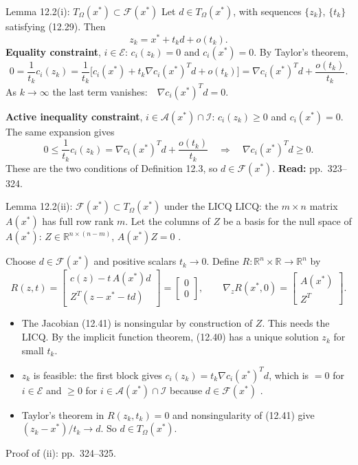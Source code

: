 \documentclass[aspectratio=169,12pt]{beamer}
\newcommand{\R}{\mathbb{R}}
\newcommand{\xs}{x^{*}}
\newcommand{\eqn}[1]{\text{\small(#1)}}
\newcommand{\readbook}[1]{{\color{red}\textbf{Read:} #1}}
\newcommand{\cA}{\mathcal{A}}
\newcommand{\cE}{\mathcal{E}}
\newcommand{\cF}{\mathcal{F}}
\newcommand{\cI}{\mathcal{I}}
\newcommand{\TO}{T_{\Omega}}
\begin{document}
\begin{frame}{Lemma 12.2(i): $\TO(\xs)\subset\cF(\xs)$}
  Let $d\in\TO(\xs)$, with sequences $\{z_{k}\}$, $\{t_{k}\}$ satisfying (12.29). Then
  \[ z_{k}=\xs+t_{k}d+o(t_{k}) . \tag{12.38} \]
  \textbf{Equality constraint}, $i\in\cE$: $c_{i}(z_{k})=0$ and $c_{i}(\xs)=0$. By Taylor's theorem,
  \[ 0=\frac{1}{t_{k}}c_{i}(z_{k})=\frac{1}{t_{k}}\bigl[c_{i}(\xs)+t_{k}\nabla c_{i}(\xs)^{T}d+o(t_{k})\bigr]
      =\nabla c_{i}(\xs)^{T}d+\frac{o(t_{k})}{t_{k}} . \]
  As $k\to\infty$ the last term vanishes:\ \ $\nabla c_{i}(\xs)^{T}d=0$.

  \vspace{0.6em}
  \textbf{Active inequality constraint}, $i\in\cA(\xs)\cap\cI$: $c_{i}(z_{k})\ge 0$ and $c_{i}(\xs)=0$.
  The same expansion gives
  \[ 0\le\frac{1}{t_{k}}c_{i}(z_{k})=\nabla c_{i}(\xs)^{T}d+\frac{o(t_{k})}{t_{k}}
     \quad\Longrightarrow\quad\nabla c_{i}(\xs)^{T}d\ge 0 . \]
  These are the two conditions of Definition 12.3, so $d\in\cF(\xs)$.
  \readbook{pp.~323--324.}
\end{frame}

\begin{frame}{Lemma 12.2(ii): $\cF(\xs)\subset\TO(\xs)$ under the LICQ}
  LICQ: the $m\times n$ matrix $A(\xs)$ has full row rank $m$. Let the columns of $Z$ be a basis for
  the null space of $A(\xs)$: $Z\in\R^{n\times(n-m)}$, $A(\xs)Z=0$ \eqn{12.39}.

  Choose $d\in\cF(\xs)$ and positive scalars $t_{k}\to 0$. Define $R:\R^{n}\times\R\to\R^{n}$ by
  \[ R(z,t)=\begin{bmatrix}c(z)-t\,A(\xs)d\\[0.15em] Z^{T}(z-\xs-td)\end{bmatrix}
      =\begin{bmatrix}0\\0\end{bmatrix},\qquad
     \nabla_{z}R(\xs,0)=\begin{bmatrix}A(\xs)\\ Z^{T}\end{bmatrix} . \tag{12.40, 12.41} \]
  \begin{itemize}\setlength\itemsep{0.3em}
    \item The Jacobian (12.41) is nonsingular by construction of $Z$. \alert{This needs the LICQ.}
      By the implicit function theorem, (12.40) has a unique solution $z_{k}$ for small $t_{k}$.
    \item $z_{k}$ is feasible: the first block gives $c_{i}(z_{k})=t_{k}\nabla c_{i}(\xs)^{T}d$, which is
      $=0$ for $i\in\cE$ and $\ge 0$ for $i\in\cA(\xs)\cap\cI$ because $d\in\cF(\xs)$ \eqn{12.42}.
    \item Taylor's theorem in $R(z_{k},t_{k})=0$ and nonsingularity of (12.41) give
      $(z_{k}-\xs)/t_{k}\to d$. So $d\in\TO(\xs)$.
  \end{itemize}
  Proof of (ii): pp.~324--325.
\end{frame}
\end{document}

